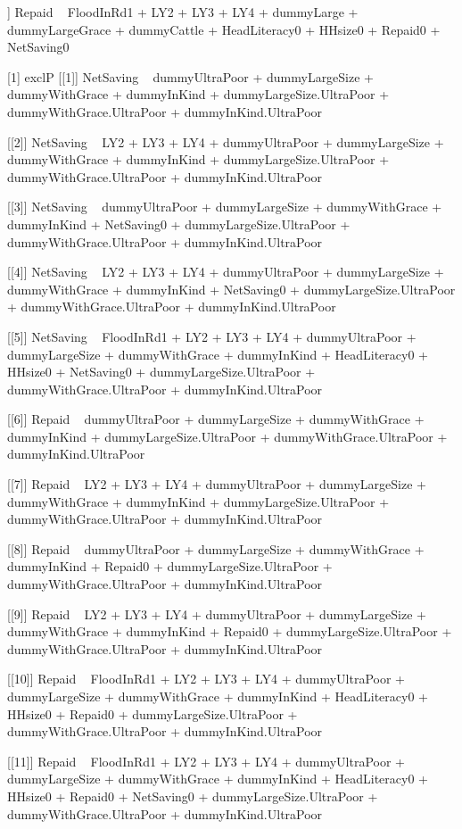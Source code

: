 \begin{Schunk}
\begin{Soutput}
[[11]]
Repaid ~ FloodInRd1 + LY2 + LY3 + LY4 + dummyLarge + dummyLargeGrace + 
    dummyCattle + HeadLiteracy0 + HHsize0 + Repaid0 + NetSaving0

[1] exclP
[[1]]
NetSaving ~ dummyUltraPoor + dummyLargeSize + dummyWithGrace + 
    dummyInKind + dummyLargeSize.UltraPoor + dummyWithGrace.UltraPoor + 
    dummyInKind.UltraPoor

[[2]]
NetSaving ~ LY2 + LY3 + LY4 + dummyUltraPoor + dummyLargeSize + 
    dummyWithGrace + dummyInKind + dummyLargeSize.UltraPoor + 
    dummyWithGrace.UltraPoor + dummyInKind.UltraPoor

[[3]]
NetSaving ~ dummyUltraPoor + dummyLargeSize + dummyWithGrace + 
    dummyInKind + NetSaving0 + dummyLargeSize.UltraPoor + dummyWithGrace.UltraPoor + 
    dummyInKind.UltraPoor

[[4]]
NetSaving ~ LY2 + LY3 + LY4 + dummyUltraPoor + dummyLargeSize + 
    dummyWithGrace + dummyInKind + NetSaving0 + dummyLargeSize.UltraPoor + 
    dummyWithGrace.UltraPoor + dummyInKind.UltraPoor

[[5]]
NetSaving ~ FloodInRd1 + LY2 + LY3 + LY4 + dummyUltraPoor + dummyLargeSize + 
    dummyWithGrace + dummyInKind + HeadLiteracy0 + HHsize0 + 
    NetSaving0 + dummyLargeSize.UltraPoor + dummyWithGrace.UltraPoor + 
    dummyInKind.UltraPoor

[[6]]
Repaid ~ dummyUltraPoor + dummyLargeSize + dummyWithGrace + dummyInKind + 
    dummyLargeSize.UltraPoor + dummyWithGrace.UltraPoor + dummyInKind.UltraPoor

[[7]]
Repaid ~ LY2 + LY3 + LY4 + dummyUltraPoor + dummyLargeSize + 
    dummyWithGrace + dummyInKind + dummyLargeSize.UltraPoor + 
    dummyWithGrace.UltraPoor + dummyInKind.UltraPoor

[[8]]
Repaid ~ dummyUltraPoor + dummyLargeSize + dummyWithGrace + dummyInKind + 
    Repaid0 + dummyLargeSize.UltraPoor + dummyWithGrace.UltraPoor + 
    dummyInKind.UltraPoor

[[9]]
Repaid ~ LY2 + LY3 + LY4 + dummyUltraPoor + dummyLargeSize + 
    dummyWithGrace + dummyInKind + Repaid0 + dummyLargeSize.UltraPoor + 
    dummyWithGrace.UltraPoor + dummyInKind.UltraPoor

[[10]]
Repaid ~ FloodInRd1 + LY2 + LY3 + LY4 + dummyUltraPoor + dummyLargeSize + 
    dummyWithGrace + dummyInKind + HeadLiteracy0 + HHsize0 + 
    Repaid0 + dummyLargeSize.UltraPoor + dummyWithGrace.UltraPoor + 
    dummyInKind.UltraPoor

[[11]]
Repaid ~ FloodInRd1 + LY2 + LY3 + LY4 + dummyUltraPoor + dummyLargeSize + 
    dummyWithGrace + dummyInKind + HeadLiteracy0 + HHsize0 + 
    Repaid0 + NetSaving0 + dummyLargeSize.UltraPoor + dummyWithGrace.UltraPoor + 
    dummyInKind.UltraPoor


\end{Soutput}
\end{Schunk}
